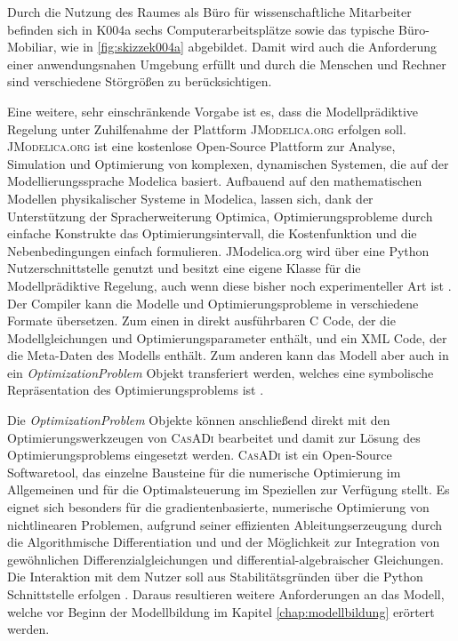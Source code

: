 Durch die Nutzung des Raumes als Büro für wissenschaftliche Mitarbeiter befinden sich in K004a sechs Computerarbeitsplätze sowie das typische Büro-Mobiliar, wie in \ref{fig:skizzek004a} abgebildet. Damit wird auch die Anforderung einer anwendungsnahen Umgebung erfüllt und durch die Menschen und Rechner sind verschiedene Störgrößen zu berücksichtigen.

Eine weitere, sehr einschränkende Vorgabe ist es, dass die Modellprädiktive Regelung unter Zuhilfenahme der Plattform \textsc{JModelica.org} erfolgen soll. \textsc{JModelica.org} ist eine kostenlose Open-Source Plattform	 zur Analyse, Simulation und Optimierung von komplexen, dynamischen Systemen, die auf der Modellierungssprache Modelica basiert. Aufbauend auf den mathematischen Modellen physikalischer Systeme in Modelica, lassen sich, dank der Unterstützung der Spracherweiterung Optimica, Optimierungsprobleme durch einfache Konstrukte das Optimierungsintervall, die Kostenfunktion und die Nebenbedingungen einfach formulieren. JModelica.org wird über eine Python Nutzerschnittstelle genutzt und besitzt eine eigene Klasse für die Modellprädiktive Regelung, auch wenn diese bisher noch experimenteller Art ist \cite[S.~1f.]{jmod15}.
Der Compiler kann die Modelle und Optimierungsprobleme in verschiedene Formate übersetzen. Zum einen in direkt ausführbaren C Code, der die Modellgleichungen und Optimierungsparameter enthält, und ein XML Code, der die Meta-Daten des Modells enthält. Zum anderen kann das Modell aber auch in ein \textit{OptimizationProblem} Objekt transferiert werden, welches eine symbolische Repräsentation des Optimierungsproblems ist \cite[S.~12ff.]{jmod15}.

Die \textit{OptimizationProblem} Objekte können anschließend direkt mit den Optimierungswerkzeugen von \textsc{CasADi} bearbeitet und damit zur Lösung des Optimierungsproblems eingesetzt werden. \textsc{CasADi} ist ein Open-Source Softwaretool, das einzelne Bausteine für die numerische Optimierung im Allgemeinen und für die Optimalsteuerung im Speziellen zur Verfügung stellt. Es eignet sich besonders für die gradientenbasierte, numerische Optimierung von nichtlinearen Problemen, aufgrund seiner effizienten Ableitungserzeugung durch die Algorithmische Differentiation und und der Möglichkeit zur Integration von gewöhnlichen Differenzialgleichungen und differential-algebraischer Gleichungen. Die Interaktion mit dem Nutzer soll aus Stabilitätsgründen über die Python Schnittstelle erfolgen \cite[S.~5f.]{casadi}.
Daraus resultieren weitere Anforderungen an das Modell, welche vor Beginn der Modellbildung im Kapitel \ref{chap:modellbildung} erörtert werden.

